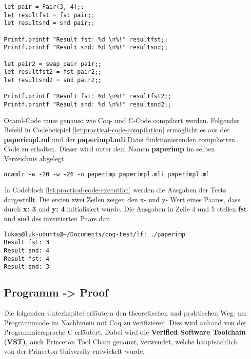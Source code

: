 \begin{lstlisting}[language=coq,firstnumber=1,caption=Ocaml Code testen (paperimpl.ml),label=lst:practical-code-adjustment]
let pair = Pair(3, 4);;
let resultfst = fst pair;;
let resultsnd = snd pair;;

Printf.printf "Result fst: %d \n%!" resultfst;;
Printf.printf "Result snd: %d \n%!" resultsnd;;

let pair2 = swap_pair pair;;
let resultfst2 = fst pair2;;
let resultsnd2 = snd pair2;;

Printf.printf "Result fst: %d \n%!" resultfst2;;
Printf.printf "Result snd: %d \n%!" resultsnd2;;
\end{lstlisting}
Ocaml-Code muss genauso wie Coq- und C-Code compiliert werden. Folgender Befehl in Codebeispiel \ref{lst:practical-code-compilation} ermöglicht es aus der \textbf{paperimpl.ml} und der \textbf{paperimpl.mli} Datei funktionierenden compilierten Code zu erhalten. Dieser wird unter dem Namen \textbf{paperimp} im selben Verzeichnis abgelegt.
\\
\begin{lstlisting}[language=coq,firstnumber=1,caption=Ocaml Code compilieren,label=lst:practical-code-compilation]
ocamlc -w -20 -w -26 -o paperimp paperimpl.mli paperimpl.ml
\end{lstlisting}

In Codeblock \ref{lst:practical-code-execution} werden die Ausgaben der Tests dargestellt. Die ersten zwei Zeilen zeigen den x- und y- Wert eines Paares, dass durch \textbf{x: 3} und \textbf{y: 4} initialisiert wurde. Die Ausgaben in Zeile 4 und 5 stellen \textbf{fst} und \textbf{snd} des invertierten Paars dar.
\begin{lstlisting}[language=coq,firstnumber=1,caption=Ocaml Code ausführen,label=lst:practical-code-execution]
lukas@luk-ubuntu@~/Documents/coq-test/lf: ./paperimp
Result fst: 3 
Result snd: 4 
Result fst: 4 
Result snd: 3 
\end{lstlisting}

\subsection{Programm -> Proof}
Die folgenden Unterkapitel erläutern den theoretischen und praktischen Weg, um Programmcode im Nachhinein mit Coq zu verifizieren. Dies wird anhand von der Programmiersprache C erläutert. Dabei wird die \textbf{Verified Software Toolchain (VST)}, auch Princeton Tool Chain genannt, verwendet, welche hauptsächlich von der Princeton University entwickelt wurde.

